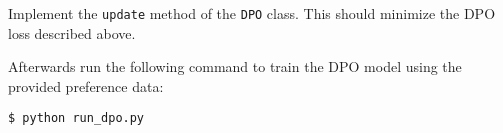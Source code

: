 \item {}

Implement the \texttt{update} method of the \texttt{DPO} class. This should minimize the DPO loss described above.

Afterwards run the following command to train the DPO model using the provided preference data:

\begin{lstlisting}
$ python run_dpo.py
\end{lstlisting}